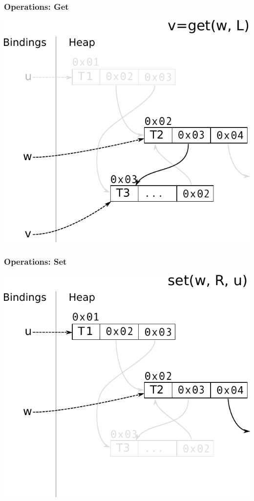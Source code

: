 \documentclass[utf8x]{beamer}
\begin{document}
\begin{frame}[plain]
  \frametitle{Operations: Get}
  \includegraphics[scale=0.8]{figures/get02}
\end{frame}

\begin{frame}[plain]
  \frametitle{Operations: Set}
  \includegraphics[scale=0.8]{figures/set01}
\end{frame}
\end{document}
